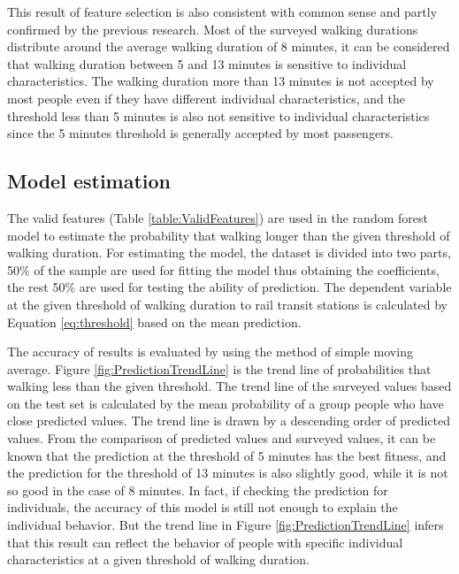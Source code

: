 \documentclass[sustainability,article,submit,moreauthors,pdftex,10pt,a4paper]{Definitions/mdpi}
\begin{document}
% 
This result of feature selection is also consistent with common sense and partly confirmed by the previous research. Most of the surveyed walking durations distribute around the average walking duration of 8 minutes, it can be considered that walking duration between 5 and 13 minutes is sensitive to individual characteristics. The walking duration more than 13 minutes is not accepted by most people even if they have different individual characteristics, and the threshold less than 5 minutes is also not sensitive to individual characteristics since the 5 minutes threshold is generally accepted by most passengers.

%
\subsection{Model estimation}
The valid features (Table \ref{table:ValidFeatures}) are used in the random forest model to estimate the probability that walking longer than the given threshold of walking duration. For estimating the model, the dataset is divided into two parts, 50\% of the sample are used for fitting the model thus obtaining the coefficients, the rest 50\% are used for testing the ability of prediction. The dependent variable at the given threshold of walking duration to rail transit stations is calculated by Equation \ref{eq:threshold} based on the mean prediction.

%
The accuracy of results is evaluated by using the method of simple moving average. Figure \ref{fig:PredictionTrendLine} is the trend line of probabilities that walking less than the given threshold. The trend line of the surveyed values based on the test set is calculated by the mean probability of a group people who have close predicted values. The trend line is drawn by a descending order of predicted values. From the comparison of predicted values and surveyed values, it can be known that the prediction at the threshold of 5 minutes has the best fitness, and the prediction for the threshold of 13 minutes is also slightly good, while it is not so good in the case of 8 minutes. In fact, if checking the prediction for individuals, the accuracy of this model is still not enough to explain the individual behavior. But the trend line in Figure \ref{fig:PredictionTrendLine} infers that this result can reflect the behavior of people with specific individual characteristics at a given threshold of walking duration. 
\end{document}
